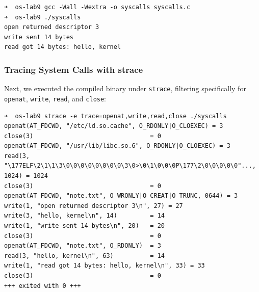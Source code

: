 \documentclass{labreport}
\begin{document}
\begin{lstlisting}[style=bash]
➜  os-lab9 gcc -Wall -Wextra -o syscalls syscalls.c
➜  os-lab9 ./syscalls
open returned descriptor 3
write sent 14 bytes
read got 14 bytes: hello, kernel
\end{lstlisting}

\subsubsection{Tracing System Calls with strace}
Next, we executed the compiled binary under \texttt{strace}, filtering specifically for \texttt{openat}, \texttt{write}, \texttt{read}, and \texttt{close}:

\begin{lstlisting}[style=bash]
➜  os-lab9 strace -e trace=openat,write,read,close ./syscalls
openat(AT_FDCWD, "/etc/ld.so.cache", O_RDONLY|O_CLOEXEC) = 3
close(3)                                = 0
openat(AT_FDCWD, "/usr/lib/libc.so.6", O_RDONLY|O_CLOEXEC) = 3
read(3, "\177ELF\2\1\1\3\0\0\0\0\0\0\0\0\3\0>\0\1\0\0\0P\177\2\0\0\0\0\0"..., 1024) = 1024
close(3)                                = 0
openat(AT_FDCWD, "note.txt", O_WRONLY|O_CREAT|O_TRUNC, 0644) = 3
write(1, "open returned descriptor 3\n", 27) = 27
write(3, "hello, kernel\n", 14)         = 14
write(1, "write sent 14 bytes\n", 20)   = 20
close(3)                                = 0
openat(AT_FDCWD, "note.txt", O_RDONLY)  = 3
read(3, "hello, kernel\n", 63)          = 14
write(1, "read got 14 bytes: hello, kernel\n", 33) = 33
close(3)                                = 0
+++ exited with 0 +++
\end{lstlisting}
\end{document}

